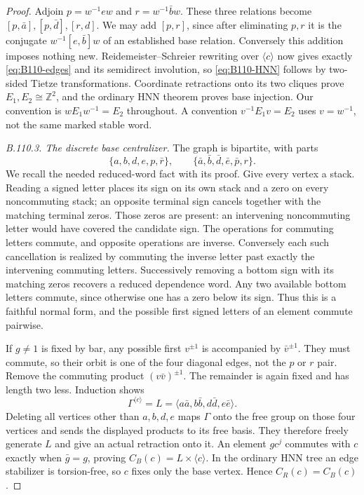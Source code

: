 \begin{proof}
Adjoin $p=w^{-1}ew$ and $r=w^{-1}\bar b w$. These three relations
become $[p,\bar a],[p,\bar d],[r,d]$. We may add $[p,r]$, since
after eliminating $p,r$ it is the conjugate $w^{-1}[e,\bar b]w$
of an established base relation. Conversely this addition imposes
nothing new. Reidemeister--Schreier rewriting over $\langle c\rangle$
now gives exactly \eqref{eq:B110-edges} and its semidirect involution,
so \eqref{eq:B110-HNN} follows by two-sided Tietze transformations.
Coordinate retractions onto its two cliques prove $E_1,E_2\cong
\mathbb Z^2$, and the ordinary HNN theorem proves base injection.
Our convention is $wE_1w^{-1}=E_2$ throughout. A convention
$v^{-1}E_1v=E_2$ uses $v=w^{-1}$, not the same marked stable word.

\emph{B.110.3. The discrete base centralizer.}
The graph is bipartite, with parts
\[
 \{a,b,d,e,p,\bar r\},\qquad
 \{\bar a,\bar b,\bar d,\bar e,\bar p,r\}.
\]
We recall the needed reduced-word fact with its proof. Give every
vertex a stack. Reading a signed letter places its sign on its own
stack and a zero on every noncommuting stack; an opposite terminal
sign cancels together with the matching terminal zeros. Those zeros
are present: an intervening noncommuting letter would have covered
the candidate sign. The operations for commuting letters commute,
and opposite operations are inverse. Conversely each such cancellation
is realized by commuting the inverse letter past exactly the intervening
commuting letters. Successively removing a bottom sign with its matching
zeros recovers a reduced dependence word. Any two available bottom
letters commute, since otherwise one has a zero below its sign.
Thus this is a faithful normal form, and the possible first signed
letters of an element commute pairwise.

If $g\ne1$ is fixed by bar, any possible first $v^{\pm1}$ is
accompanied by $\bar v^{\pm1}$. They must commute, so their orbit
is one of the four diagonal edges, not the $p$ or $r$ pair. Remove
the commuting product $(v\bar v)^{\pm1}$. The remainder is again
fixed and has length two less. Induction shows
\[
 \Gamma^{\langle c\rangle}
   =L=\langle a\bar a,b\bar b,d\bar d,e\bar e\rangle.
\]
Deleting all vertices other than $a,b,d,e$ maps $\Gamma$ onto the
free group on those four vertices and sends the displayed products
to its free basis. They therefore freely generate $L$ and give an
actual retraction onto it. An element $gc^j$ commutes with $c$
exactly when $\bar g=g$, proving $C_B(c)=L\times\langle c\rangle$.
In the ordinary HNN tree an edge stabilizer is torsion-free, so $c$
fixes only the base vertex. Hence $C_R(c)=C_B(c)$.


\end{proof}
